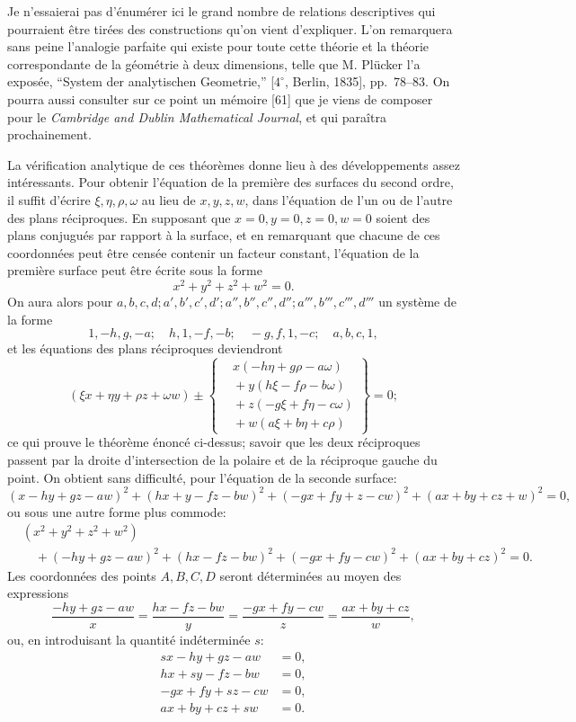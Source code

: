 \documentclass[10pt]{article}
\newcommand{\qedpage}{\vfill\pagebreak}
\begin{document}
Je n'essaierai pas d'\'enum\'erer ici le grand nombre de relations descriptives qui
pourraient \^etre tir\'ees des constructions qu'on vient d'expliquer. L'on remarquera
sans peine l'analogie parfaite qui existe pour toute cette th\'eorie et la th\'eorie
correspondante de la g\'eom\'etrie \`a deux dimensions, telle que M. Pl\"ucker l'a
expos\'ee, ``System der analytischen Geometrie,'' [$4^\circ$, Berlin, 1835], pp.~78--83.
On pourra aussi consulter sur ce point un m\'emoire [61] que je viens de composer
pour le \textit{Cambridge and Dublin Mathematical Journal}, et qui para\^itra
prochainement.

La v\'erification analytique de ces th\'eor\`emes donne lieu \`a des d\'eveloppements
assez int\'eressants. Pour obtenir l'\'equation de la premi\`ere des surfaces du second
ordre, il suffit d'\'ecrire $\xi,\eta,\rho,\omega$ au lieu de $x,y,z,w$, dans
l'\'equation de l'un ou de l'autre des plans r\'eciproques. En supposant que
$x=0,y=0,z=0,w=0$ soient des plans conjugu\'es par rapport \`a la surface, et en
remarquant que chacune de ces coordonn\'ees peut \^etre cens\'ee contenir un facteur
constant, l'\'equation de la premi\`ere surface peut \^etre \'ecrite sous la forme
\[
x^2+y^2+z^2+w^2=0.
\]
On aura alors pour $a,b,c,d; a',b',c',d'; a'',b'',c'',d''; a''',b''',c''',d'''$
un syst\`eme de la forme
\[
1,-h,g,-a;\quad h,1,-f,-b;\quad -g,f,1,-c;\quad a,b,c,1,
\]
et les \'equations des plans r\'eciproques deviendront
\[
\left(\xi x+\eta y+\rho z+\omega w\right)\pm
\left\{
\begin{aligned}
&x(-h\eta+g\rho-a\omega)\\
&{}+y(h\xi-f\rho-b\omega)\\
&{}+z(-g\xi+f\eta-c\omega)\\
&{}+w(a\xi+b\eta+c\rho)
\end{aligned}
\right\}=0;
\]
ce qui prouve le th\'eor\`eme \'enonc\'e ci-dessus; savoir que les deux r\'eciproques
passent par la droite d'intersection de la polaire et de la r\'eciproque gauche du
point. On obtient sans difficult\'e, pour l'\'equation de la seconde surface:
\[
(x-hy+gz-aw)^2+(hx+y-fz-bw)^2+(-gx+fy+z-cw)^2+(ax+by+cz+w)^2=0,
\]
ou sous une autre forme plus commode:
\[
\begin{aligned}
&(x^2+y^2+z^2+w^2)\\
&\quad+(-hy+gz-aw)^2+(hx-fz-bw)^2+(-gx+fy-cw)^2+(ax+by+cz)^2=0.
\end{aligned}
\]
Les coordonn\'ees des points $A,B,C,D$ seront d\'etermin\'ees au moyen des expressions
\[
\frac{-hy+gz-aw}{x}=\frac{hx-fz-bw}{y}
=\frac{-gx+fy-cw}{z}=\frac{ax+by+cz}{w},
\]
ou, en introduisant la quantit\'e ind\'etermin\'ee $s$:
\[
\begin{aligned}
sx-hy+gz-aw&=0,\\
hx+sy-fz-bw&=0,\\
-gx+fy+sz-cw&=0,\\
ax+by+cz+sw&=0.
\end{aligned}
\]
\qedpage
\end{document}
